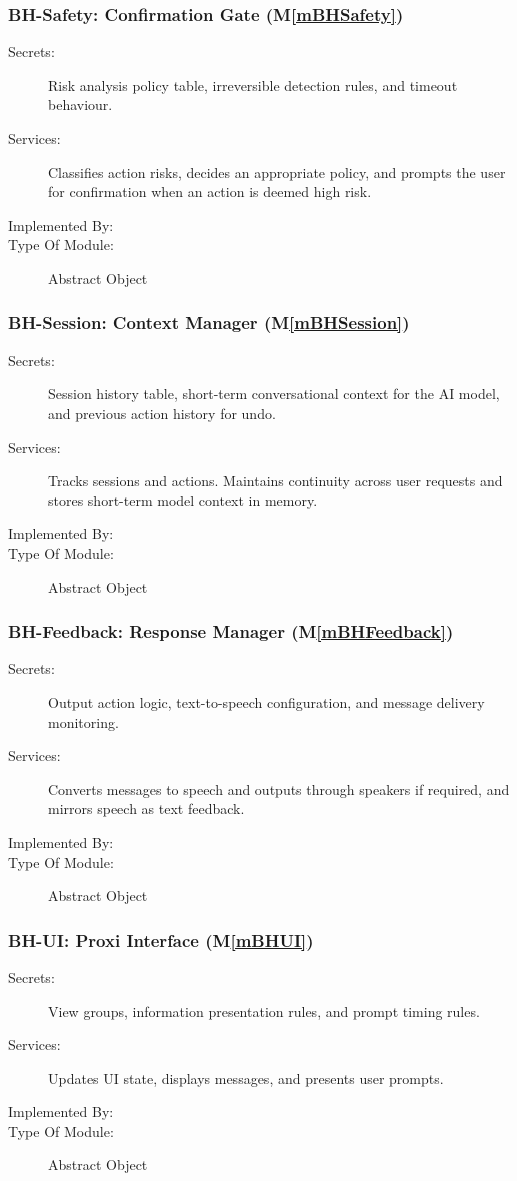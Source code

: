 \documentclass[12pt, titlepage]{article}
\newcommand{\mref}[1]{M\ref{#1}}
\begin{document}
\subsubsection{BH-Safety: Confirmation Gate (\mref{mBHSafety})}
\begin{description}
\item[Secrets:] Risk analysis policy table, irreversible detection rules, and
timeout behaviour.
\item[Services:] Classifies action risks, decides an appropriate policy, and
prompts the user for confirmation when an action is deemed high risk.
\item[Implemented By:] \progname{}
\item[Type Of Module:] Abstract Object
\end{description}

\subsubsection{BH-Session: Context Manager (\mref{mBHSession})}
\begin{description}
\item[Secrets:] Session history table, short-term conversational context for the
AI model, and previous action history for undo.
\item[Services:] Tracks sessions and actions. Maintains continuity across user
requests and stores short-term model context in memory.
\item[Implemented By:] \progname{}
\item[Type Of Module:] Abstract Object
\end{description}

\subsubsection{BH-Feedback: Response Manager (\mref{mBHFeedback})}
\begin{description}
\item[Secrets:] Output action logic, text-to-speech configuration, and message
delivery monitoring.
\item[Services:] Converts messages to speech and outputs through speakers if
required, and mirrors speech as text feedback.
\item[Implemented By:] \progname{}
\item[Type Of Module:] Abstract Object
\end{description}

\subsubsection{BH-UI: Proxi Interface (\mref{mBHUI})}
\begin{description}
\item[Secrets:] View groups, information presentation rules, and prompt timing
rules.
\item[Services:] Updates UI state, displays messages, and presents user prompts.
\item[Implemented By:] \progname{}
\item[Type Of Module:] Abstract Object
\end{description}
\end{document}
